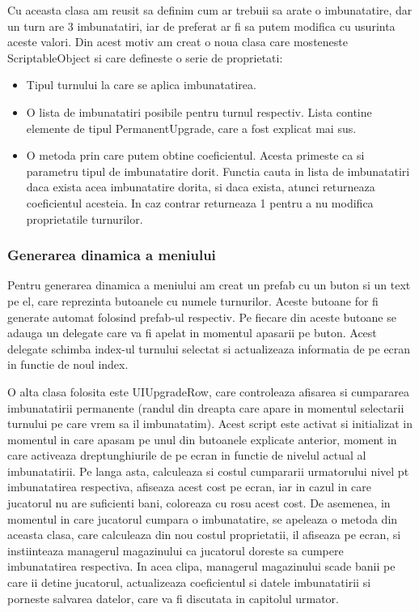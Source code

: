 \documentclass[12pt, a4paper]{article}
\begin{document}
	Cu aceasta clasa am reusit sa definim cum ar trebuii sa arate o imbunatatire, dar un turn are 3 imbunatatiri, iar de preferat ar fi sa putem modifica cu usurinta aceste valori. Din acest motiv am creat o noua clasa care mosteneste ScriptableObject si care defineste o serie de proprietati:
	
	\begin{itemize}
		\item Tipul turnului la care se aplica imbunatatirea.
		\item O lista de imbunatatiri posibile pentru turnul respectiv. Lista contine elemente de tipul PermanentUpgrade, care a fost explicat mai sus.
		\item O metoda prin care putem obtine coeficientul. Acesta primeste ca si parametru tipul de imbunatatire dorit. Functia cauta in lista de imbunatatiri daca exista acea imbunatatire dorita, si daca exista, atunci returneaza coeficientul acesteia. In caz contrar returneaza 1 pentru a nu modifica proprietatile turnurilor.
	\end{itemize}
	
	\subsubsection{Generarea dinamica a meniului}
	
	Pentru generarea dinamica a meniului am creat un prefab cu un buton si un text pe el, care reprezinta butoanele cu numele turnurilor. Aceste butoane for fi generate automat folosind prefab-ul respectiv. Pe fiecare din aceste butoane se adauga un delegate care va fi apelat in momentul apasarii pe buton. Acest delegate schimba index-ul turnului selectat si actualizeaza informatia de pe ecran in functie de noul index.
	\newline
	
	O alta clasa folosita este UIUpgradeRow, care controleaza afisarea si cumpararea imbunatatirii permanente (randul din dreapta care apare in momentul selectarii turnului pe care vrem sa il imbunatatim). Acest script este activat si initializat in momentul in care apasam pe unul din butoanele explicate anterior, moment in care activeaza dreptunghiurile de pe ecran in functie de nivelul actual al imbunatatirii. Pe langa asta, calculeaza si costul cumpararii urmatorului nivel pt imbunatatirea respectiva, afiseaza acest cost pe ecran, iar in cazul in care jucatorul nu are suficienti bani, coloreaza cu rosu acest cost. De asemenea, in momentul in care jucatorul cumpara o imbunatatire, se apeleaza o metoda din aceasta clasa, care calculeaza din nou costul proprietatii, il afiseaza pe ecran, si instiinteaza managerul magazinului ca jucatorul doreste sa cumpere imbunatatirea respectiva. In acea clipa, managerul magazinului scade banii pe care ii detine jucatorul, actualizeaza coeficientul si datele imbunatatirii si porneste salvarea datelor, care va fi discutata in capitolul urmator.
	\newline
	
\end{document}
